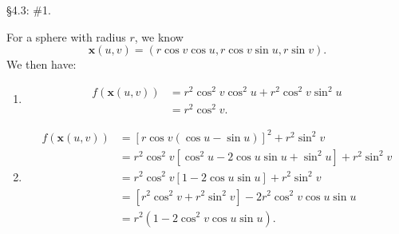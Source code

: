 \documentclass[10pt]{report}
\begin{document}
\begin{exer}[]
\S 4.3: \#1.
\end{exer}
For a sphere with radius $r$, we know
\[
	\mathbf{x}(u,v) = (r \cos v \cos u, r\cos v \sin u, r \sin v).
\] We then have:
\begin{enumerate}
	\item
		\begin{align*}
			f(\mathbf{x}(u,v)) &= r^2 \cos^2v\cos^2u + r^2\cos^2v\sin^2u \\
					   &= r^2\cos^2v.
		\end{align*}

	\item 
		\begin{align*}
			f(\mathbf{x}(u,v)) &= \left[ r\cos v(\cos u-\sin u) \right]^2 + r^2 \sin^2 v \\
					   &= r^2\cos^2v\left[ \cos^2u-2\cos u\sin u+\sin^2u \right]+r^2\sin^2v \\
					   &= r^2\cos^2v\left[ 1-2\cos u \sin u \right]+r^2\sin^2v \\
					   &= [r^2\cos^2v + r^2 \sin^2v] - 2r^2 \cos^2v \cos u\sin u \\
					   &= r^2(1- 2\cos^2v \cos u \sin u).
		\end{align*}
\end{enumerate}
\end{document}
